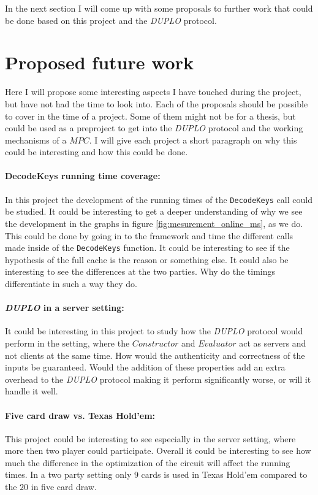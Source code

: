 \documentclass[twoside,11pt,openright]{report}
\newcommand{\DUPLO}{\textit{DUPLO} }
\begin{document}
\bigskip

In the next section I will come up with some proposals to further work that could be done based on this project and the \DUPLO protocol.

\section{Proposed future work}
Here I will propose some interesting aspects I have touched during the project, but have not had the time to look into. Each of the proposals should be possible to cover in the time of a project. Some of them might not be for a thesis, but could be used as a preproject to get into the \DUPLO protocol and the working mechanisms of a $MPC$. I will give each project a short paragraph on why this could be interesting and how this could be done.

\paragraph{DecodeKeys running time coverage:}
In this project the development of the running times of the \verb|DecodeKeys| call could be studied. It could be interesting to get a deeper understanding of why we see the development in the graphs in figure \ref{fig:mesurement_online_ms}, as we do. This could be done by going in to the framework and time the different calls made inside of the \verb|DecodeKeys| function. It could be interesting to see if the hypothesis of the full cache is the reason or something else. It could also be interesting to see the differences at the two parties. Why do the timings differentiate in such a way they do.

\paragraph{\DUPLO in a server setting:}
It could be interesting in this project to study how the \DUPLO protocol would perform in the setting, where the $Constructor$ and $Evaluator$ act as servers and not clients at the same time. How would the authenticity and correctness of the inputs be guaranteed. Would the addition of these properties add an extra overhead to the \DUPLO protocol making it perform significantly worse, or will it handle it well. 

\paragraph{Five card draw vs. Texas Hold'em:}
This project could be interesting to see especially in the server setting, where more then two player could participate. Overall it could be interesting to see how much the difference in the optimization of the circuit will affect the running times. In a two party setting only $9$ cards is used in Texas Hold'em compared to the $20$ in five card draw.
\end{document}
